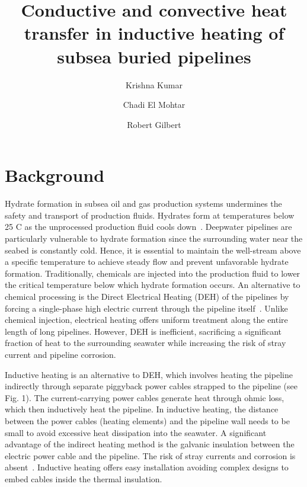 \documentclass[Journal,letterpaper,InsideFigs]{ascelike-new}
\begin{document}
\title{Conductive and convective heat transfer in inductive heating of subsea buried pipelines}

\author[1]{Krishna Kumar}
\author[2]{Chadi El Mohtar}
\author[2]{Robert Gilbert}


\maketitle

\begin{abstract}
\end{abstract}

\section{Background}
Hydrate formation in subsea oil and gas production systems undermines the safety and transport of production fluids. Hydrates form at temperatures below 25 C as the unprocessed production fluid cools down~\cite{nazeri2014evaluation,daraboina2015natural}. Deepwater pipelines are particularly vulnerable to hydrate formation since the surrounding water near the seabed is constantly cold. Hence, it is essential to maintain the well-stream above a specific temperature to achieve steady flow and prevent unfavorable hydrate formation. Traditionally, chemicals are injected into the production fluid to lower the critical temperature below which hydrate formation occurs. An alternative to chemical processing is the Direct Electrical Heating (DEH) of the pipelines by forcing a single-phase high electric current through the pipeline itself~\cite{nysveen2005direct}. Unlike chemical injection, electrical heating offers uniform treatment along the entire length of long pipelines. However, DEH is inefficient, sacrificing a  significant fraction of heat to the surrounding seawater while increasing the risk of stray current and pipeline corrosion. 


Inductive heating is an alternative to DEH, which involves heating the pipeline indirectly through separate piggyback power cables strapped to the pipeline (see Fig. 1). The current-carrying power cables generate heat through ohmic loss, which then inductively heat the pipeline. In inductive heating, the distance between the power cables (heating elements) and the pipeline wall needs to be small to avoid excessive heat dissipation into the seawater. A significant advantage of the indirect heating method is the galvanic insulation between the electric power cable and the pipeline. The risk of stray currents and corrosion is absent~\cite{nysveen2005direct}. Inductive heating offers easy installation avoiding complex designs to embed cables inside the thermal insulation. 
\end{document}
